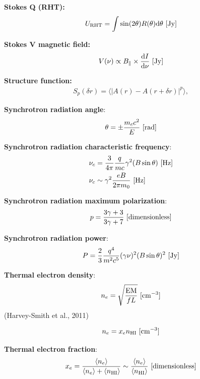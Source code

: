 \documentclass[a4paper,10pt]{article}
\begin{document}
{\noindent}\textbf{Stokes Q (RHT):}
\begin{align*}
    U_\mathrm{RHT} = \int\sin(2\theta)R(\theta)\mathrm{d}\theta ~ [{\rm Jy}]
\end{align*}

{\noindent}\textbf{Stokes V magnetic field:}
\begin{align*}
    V(\nu) \propto B_\parallel \times \frac{\mathrm{d}I}{\mathrm{d}\nu} ~ [\rm Jy]
\end{align*}

{\noindent}\textbf{Structure function:}
\begin{align*}
    S_p(\delta r) = \langle\lvert A(r)-A(r+\delta r)\rvert^p\rangle,
\end{align*}

{\noindent}\textbf{Synchrotron radiation angle}:
\begin{align*}
\theta = \pm \frac{m_cc^2}{E} ~ [\rm rad]
\end{align*}

{\noindent}\textbf{Synchrotron radiation characteristic frequency}:
\begin{align*}
\nu_c &= \dfrac{3}{4\pi}\dfrac{q}{mc}\gamma^2(B\sin\theta)~[{\rm Hz}] \\
\nu_c &\sim \gamma^2 \frac{eB}{2\pi m_0} ~ [{\rm Hz}]
\end{align*}

{\noindent}\textbf{Synchrotron radiation maximum polarization}:
\begin{align*}
p = \frac{3\gamma + 3}{3\gamma+7} ~ [{\rm dimensionless}]
\end{align*}

{\noindent}\textbf{Synchrotron radiation power}:
\begin{align*}
P = \frac{2}{3}\dfrac{q^4}{m^2c^5}(\gamma\nu)^2(B\sin\theta)^2 ~ [{\rm Jy}]
\end{align*}

{\noindent}\textbf{Thermal electron density}:
\begin{align*}
    n_e = \sqrt{\frac{{\rm EM}}{fL}} ~ [{\rm cm^{-3}}]
\end{align*}
(Harvey-Smith et al., 2011)

\begin{align*}
    n_e = x_en_{\rm HI} ~ [{\rm cm^{-3}}]
\end{align*}

{\noindent}\textbf{Thermal electron fraction}:
\begin{align*}
    x_e = \frac{\langle n_e\rangle}{\langle n_e\rangle + \langle n_{\rm HI}\rangle} \sim \frac{\langle n_e\rangle}{\langle n_{\rm HI}\rangle} ~ [{\rm dimensionless}]
\end{align*}
\end{document}
